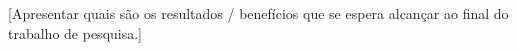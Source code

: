 
[Apresentar quais são os resultados / benefícios que se espera alcançar ao final do trabalho de pesquisa.]